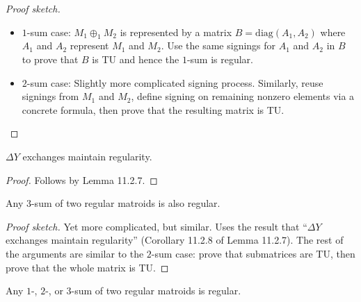 \begin{proof}[Proof sketch]
  \begin{itemize}
    \item $1$-sum case: $M_{1} \oplus_{1} M_{2}$ is represented by a matrix $B = \mathrm{diag} (A_{1}, A_{2})$ where $A_{1}$ and $A_{2}$ represent $M_{1}$ and $M_{2}$. Use the same signings for $A_{1}$ and $A_{2}$ in $B$ to prove that $B$ is TU and hence the $1$-sum is regular.
    \item $2$-sum case: Slightly more complicated signing process. Similarly, reuse signings from $M_{1}$ and $M_{2}$, define signing on remaining nonzero elements via a concrete formula, then prove that the resulting matrix is TU.
  \end{itemize}
\end{proof}

\begin{lemma}[11.2.7]
  \label{lem:11.2.7}
\end{lemma}

\begin{corollary}[11.2.8]
  \label{cor:11.2.8}
  $\Delta Y$ exchanges maintain regularity.
\end{corollary}

\begin{proof}
  Follows by Lemma 11.2.7.
\end{proof}

\begin{lemma}[11.2.9]
  \label{lem:11.2.9}
  Any $3$-sum of two regular matroids is also regular.
\end{lemma}

\begin{proof}[Proof sketch]
  Yet more complicated, but similar. Uses the result that ``$\Delta Y$ exchanges maintain regularity'' (Corollary 11.2.8 of Lemma 11.2.7). The rest of the arguments are similar to the $2$-sum case: prove that submatrices are TU, then prove that the whole matrix is TU.
\end{proof}

\begin{theorem}[11.2.10]
  \label{thm:11.2.10}
  Any $1$-, $2$-, or $3$-sum of two regular matroids is regular.
\end{theorem}

